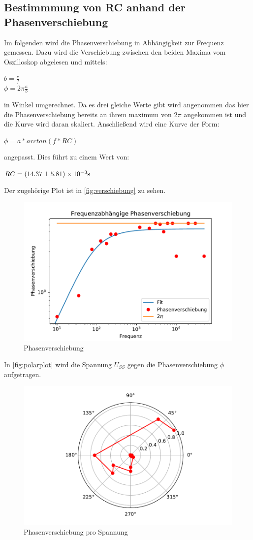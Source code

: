 \subsection{Bestimmmung von RC  anhand der Phasenverschiebung}
\label{sec:auswertungdrei}
Im folgenden wird die Phasenverschiebung in Abhängigkeit zur Frequenz gemessen. Dazu wird die Verschiebung
zwischen den beiden Maxima vom Oszilloskop abgelesen und mittels:
\begin{center}
    $b=\frac{c}{f}$\\
    $\phi=2\pi \frac{a}{b}$\\
\end{center}
in Winkel umgerechnet. Da es drei gleiche Werte gibt wird angenommen das hier die Phasenverschiebung
bereits an ihrem maximum von $2\pi$ angekommen ist und die Kurve wird daran skaliert. Anschließend wird eine Kurve der Form:
\begin{center}
    $\phi=a *arctan(f*RC)$
\end{center}
angepasst. Dies führt zu einem Wert von:
\begin{center}
    $RC=(14.37 \pm 5.81)\times10^{-3}\si[]{s}$
\end{center}
Der zugehörige Plot ist in \autoref{fig:verschiebung} zu sehen.
\begin{figure}
    \centering
    \includegraphics{verschiebung.pdf}
    \caption{Phasenverschiebung}
    \label{fig:verschiebung}
  \end{figure}
In \autoref{fig:polarplot} wird die Spannung $U_{SS}$ gegen die Phasenverschiebung $\phi$ aufgetragen.
  \begin{figure}
    \centering
    \includegraphics{polar.pdf}
    \caption{Phasenverschiebung pro Spannung}
    \label{fig:polarplot}
  \end{figure}